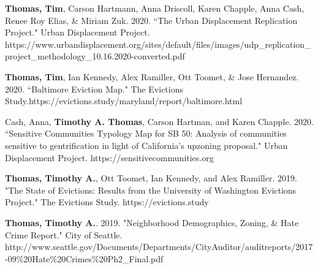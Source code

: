 

\begin{cvparagraph}

\textbf{Thomas, Tim}, Carson Hartmann, Anna Driscoll, Karen Chapple, Anna Cash, Renee Roy Elias, \& Miriam Zuk. 2020. “The Urban Displacement Replication Project." Urban Displacement Project. https://www.urbandisplacement.org/sites/default/files/images/\newline udp\_replication\_project\_methodology\_10.16.2020-converted.pdf
\end{cvparagraph}

\begin{cvparagraph}

\textbf{Thomas, Tim}, Ian Kennedy, Alex Ramiller, Ott Toomet, \& Jose Hernandez. 2020. “Baltimore Eviction Map." The Evictions Study.\newline https://evictions.study/maryland/report/baltimore.html
\end{cvparagraph}

\begin{cvparagraph}

Cash, Anna, \textbf{Timothy A. Thomas}, Carson Hartman, and Karen Chapple. 2020. “Sensitive Communities Typology Map for SB 50: Analysis of communities sensitive to gentrification in light of California's upzoning proposal." Urban Displacement Project. https://sensitivecommunities.org
\end{cvparagraph}

\begin{cvparagraph}

\textbf{Thomas, Timothy A.}, Ott Toomet, Ian Kennedy, and Alex Ramiller. 2019. "The State of Evictions: Results from the University of Washington Evictions Project." The Evictions Study. https://evictions.study
\end{cvparagraph}

\begin{cvparagraph}

\textbf{Thomas, Timothy A.}. 2019. "Neighborhood Demographics, Zoning, & Hate Crime Report." City of Seattle. http://www.seattle.gov/Documents/Departments\newline/CityAuditor/auditreports/2017-09\%20Hate\%20Crimes\%20Ph2\_Final.pdf
\end{cvparagraph}